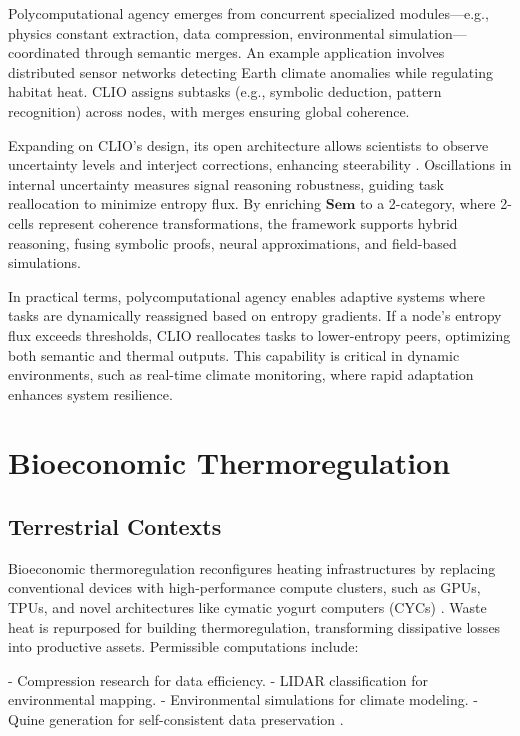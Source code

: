 \documentclass[12pt]{article}
\begin{document}
Polycomputational agency emerges from concurrent specialized modules—e.g., physics constant extraction, data compression, environmental simulation—coordinated through semantic merges. An example application involves distributed sensor networks detecting Earth climate anomalies while regulating habitat heat. CLIO assigns subtasks (e.g., symbolic deduction, pattern recognition) across nodes, with merges ensuring global coherence.

Expanding on CLIO’s design, its open architecture allows scientists to observe uncertainty levels and interject corrections, enhancing steerability \citep{ChengBroadbentChappell2025}. Oscillations in internal uncertainty measures signal reasoning robustness, guiding task reallocation to minimize entropy flux. By enriching \( \mathbf{Sem} \) to a 2-category, where 2-cells represent coherence transformations, the framework supports hybrid reasoning, fusing symbolic proofs, neural approximations, and field-based simulations.

In practical terms, polycomputational agency enables adaptive systems where tasks are dynamically reassigned based on entropy gradients. If a node’s entropy flux exceeds thresholds, CLIO reallocates tasks to lower-entropy peers, optimizing both semantic and thermal outputs. This capability is critical in dynamic environments, such as real-time climate monitoring, where rapid adaptation enhances system resilience.

\section{Bioeconomic Thermoregulation}
\label{sec:bioeconomic-thermoregulation}

\subsection{Terrestrial Contexts}

Bioeconomic thermoregulation reconfigures heating infrastructures by replacing conventional devices with high-performance compute clusters, such as GPUs, TPUs, and novel architectures like cymatic yogurt computers (CYCs) \citep{Bennett1982, SagawaUeda2009}. Waste heat is repurposed for building thermoregulation, transforming dissipative losses into productive assets. Permissible computations include:

- Compression research for data efficiency.
- LIDAR classification for environmental mapping.
- Environmental simulations for climate modeling.
- Quine generation for self-consistent data preservation \citep{Wolfram2002}.
\end{document}
